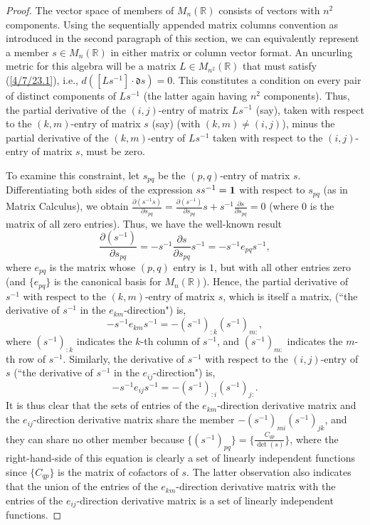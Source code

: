 \documentclass{amsart}
\numberwithin{equation}{section}
\theoremstyle{definition}
\numberwithin{theorem}{section}
\begin{document}
 \begin{proof} The vector space of members of $ M_n(\mathbb{R})$ consists of  vectors with $n^2$ components.   Using the sequentially appended matrix columns convention as introduced in the second paragraph of this section, we can equivalently represent a member $s\in M_n(\mathbb{R})$ in either matrix or column vector format.   An uncurling metric for this algebra will be a matrix $L\in M_{n^2}(\mathbb{R})$ that must satisfy (\ref{4/7/23.1}), i.e., $d\left([Ls^{-1}]\cdot \mathfrak{d}s\right)=0$. This constitutes a condition on every pair of distinct components of $Ls^{-1}$ (the latter again having $n^2$ components).  Thus,  the partial derivative of the  $(i,j)$-entry of matrix $Ls^{-1}$ (say), taken with respect to the $(k,m)$-entry of matrix $s$ (say) (with $(k,m)\ne (i,j)$),  minus  the partial derivative of the $(k,m)$-entry of $Ls^{-1}$  taken with respect to the $(i,j)$-entry of matrix $s$, must be zero.
 
 To examine this constraint, let $s_{pq}$ be the $(p,q)$-entry of matrix $s$.   Differentiating both sides of the expression
$ ss^{-1} = {\bf 1}$ with respect to $s_{pq}$ (as in Matrix Calculus), we obtain $\frac{\partial (s^{-1}s)}{\partial s_{pq}} = \frac{\partial (s^{-1})}{\partial s_{pq}}s + s^{-1}\frac{\partial s}{\partial s_{pq}}=0$ (where $0$ is the matrix of all zero entries).  Thus, we have the well-known result 
 \[ \frac{\partial (s^{-1})}{\partial s_{pq}} = -s^{-1}\frac{\partial s}{\partial s_{pq}}s^{-1} = -s^{-1}e_{pq}s^{-1},\]   where $e_{pq}$ is the matrix whose $(p,q)$ entry is $1$, but with all other entries zero (and $\{ e_{pq}\}$ is the canonical basis for $ M_n(\mathbb{R})$).  
 Hence, the partial derivative of $s^{-1}$ with respect to the  $(k,m)$-entry of matrix $s$, which is itself a matrix, (``the derivative of $s^{-1}$ in the $e_{km}$-direction") is, \begin{equation}\label{8/18/22.5} -s^{-1} e_{km}s^{-1} = -(s^{-1})_{:k} (s^{-1})_{m:},\end{equation} where $(s^{-1})_{:k}$ indicates the $k$-th column of $s^{-1}$, and $(s^{-1})_{m:}$ indicates the $m$-th row of $s^{-1}$.    Similarly, the derivative of $s^{-1}$ with respect to the $(i,j)$-entry of $s$ (``the derivative of $s^{-1}$ in the $e_{ij}$-direction")  is, \begin{equation}\label{8/18/22.6} -s^{-1} e_{ij}s^{-1} = -(s^{-1})_{:i} (s^{-1})_{j:}.\end{equation}  It is thus clear that the sets of entries of the $e_{km}$-direction derivative matrix and the $e_{ij}$-direction derivative  matrix share the member  $-(s^{-1})_{mi} (s^{-1})_{jk}$, and they can share no other member because $\{(s^{-1})_{pq}\} = \{\frac{C_{qp}}{\det(s)}\}$, where the right-hand-side of this equation is clearly a set of linearly independent functions since $\{C_{qp}\}$ is the matrix of cofactors of $s$.  The latter observation also indicates that the union of the entries of the $e_{km}$-direction derivative matrix with the entries of the $e_{ij}$-direction derivative matrix is a set of linearly independent functions.


\end{proof}
\end{document}
